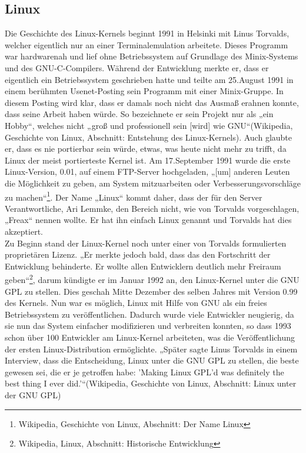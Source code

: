 \documentclass[a4paper,12pt]{article}
\begin{document}
\subsection{Linux}
Die Geschichte des Linux-Kernels beginnt 1991 in Helsinki mit Linus Torvalds, welcher eigentlich nur an einer Terminalemulation arbeitete. Dieses Programm war hardwarenah und lief ohne Betriebssystem auf Grundlage des Minix-Systems und des GNU-C-Compilers. Während der Entwicklung merkte er, dass er eigentlich ein Betriebssystem geschrieben hatte und teilte am 25.August 1991 in einem berühmten Usenet-Posting sein Programm mit einer Minix-Gruppe. In diesem Posting wird klar, dass er damals noch nicht das Ausmaß erahnen konnte, dass seine Arbeit haben würde. So bezeichnete er sein Projekt nur als „ein Hobby“, welches nicht „groß und professionell sein [wird] wie GNU“(Wikipedia, Geschichte von Linux, Abschnitt: Entstehung des Linux-Kernels). Auch glaubte er, dass es nie portierbar sein würde, etwas, was heute nicht mehr zu trifft, da Linux der meist portierteste Kernel ist. Am 17.September 1991 wurde die erste Linux-Version, 0.01, auf einem FTP-Server hochgeladen, „[um] anderen Leuten die Möglichkeit zu geben, am System mitzuarbeiten oder Verbesserungsvorschläge zu machen“\footnote{Wikipedia, Geschichte von Linux, Abschnitt: Der Name Linux}. Der Name „Linux“ kommt daher, dass der für den Server Verantwortliche, Ari Lemmke, den Bereich nicht, wie von Torvalds vorgeschlagen, „Freax“ nennen wollte. Er hat ihn einfach Linux genannt und Torvalds hat dies akzeptiert.\\
Zu Beginn stand der Linux-Kernel noch unter einer von Torvalds formulierten proprietären Lizenz. „Er merkte jedoch bald, dass das den Fortschritt der Entwicklung behinderte. Er wollte allen Entwicklern deutlich mehr Freiraum geben“\footnote{Wikipedia, Linux, Abschnitt: Historische Entwicklung}, darum kündigte er im Januar 1992 an, den Linux-Kernel unter die GNU GPL zu stellen. Dies geschah Mitte Dezember des selben Jahres mit Version 0.99 des Kernels. Nun war es möglich, Linux mit Hilfe von GNU als ein freies Betriebssystem zu veröffentlichen. Dadurch wurde viele Entwickler neugierig, da sie nun das System einfacher modifizieren und verbreiten konnten, so dass 1993 schon über 100 Entwickler am Linux-Kernel arbeiteten, was die Veröffentlichung der ersten Linux-Distribution ermöglichte. „Später sagte Linus Torvalds in einem Interview, dass die Entscheidung, Linux unter die GNU GPL zu stellen, die beste gewesen sei, die er je getroffen habe: 'Making Linux GPL'd was definitely the best thing I ever did.'“(Wikipedia, Geschichte von Linux, Abschnitt: Linux unter der GNU GPL)\\
\end{document}
